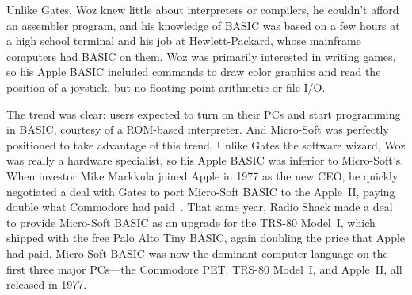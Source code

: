 \begin{tangent}
Unlike Gates, Woz knew little about interpreters or compilers, he
couldn't afford an assembler program, and his knowledge of BASIC was
based on a few hours at a high school terminal and his job at
Hewlett-Packard, whose mainframe computers had BASIC on them.
Woz was primarily interested in writing games, so his Apple BASIC
included commands to draw color graphics and read the position of a
joystick, but no floating-point arithmetic or file I/O.
\end{tangent}


The trend was clear: users expected to turn on their PCs and start
programming in BASIC, courtesy of a ROM-based interpreter.
And Micro-Soft was perfectly positioned to take advantage of this
trend.
Unlike Gates the software wizard, Woz was really a hardware specialist, so
his Apple BASIC was inferior to Micro-Soft's.
When investor Mike Markkula joined Apple in 1977
as the new CEO, he quickly negotiated a deal with Gates to port
Micro-Soft BASIC to the Apple~II, paying double what Commodore had
paid~\cite[p. 114]{commodore}.
That same year, Radio Shack made a deal to provide Micro-Soft
BASIC as an upgrade for the TRS-80 Model~I, which shipped with 
the free Palo Alto Tiny BASIC,
again doubling the price that Apple had paid.
Micro-Soft BASIC was now the dominant computer language on the first
three major PCs---the Commodore PET, TRS-80 Model~I, and Apple~II, all
released in 1977.


